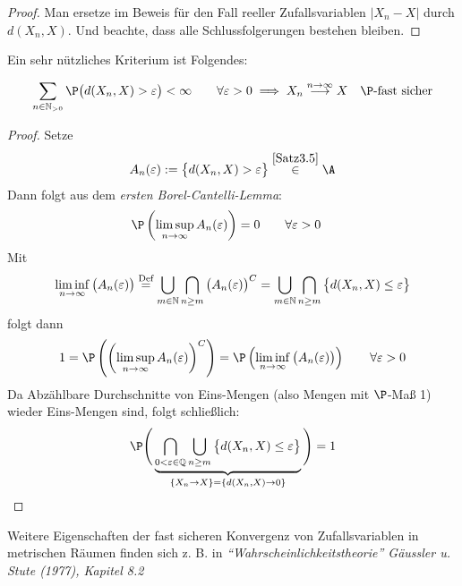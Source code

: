 \begin{proof}
	Man ersetze im Beweis für den Fall reeller Zufallsvariablen $|X_n-X|$ durch $d(X_n,X)$. 
	Und beachte, dass alle Schlussfolgerungen bestehen bleiben.
\end{proof}

Ein sehr nützliches Kriterium ist Folgendes:
\begin{satz}\label{Satz3.10} %
	\begin{align*}
		\sum\limits_{n\in\N_{>0}}\P\big(d(X_n,X)>\varepsilon\big)<\infty\qquad\forall\varepsilon>0
		\implies
		X_n
		\stackrel{n\to\infty}{\longrightarrow}
		X\quad\P\text{-fast sicher}
	\end{align*}
\end{satz}

\begin{proof}
	Setze
	\begin{align*}
		A_n(\varepsilon):=\big\lbrace d(X_n,X)>\varepsilon\big\rbrace\stackrel{\ref{Satz3.5}}{\in}\A
	\end{align*}
	Dann folgt aus dem \textit{ersten Borel-Cantelli-Lemma}:
	\begin{align*}
		&\P\left(\limsup\limits_{n\to\infty} A_n(\varepsilon)\right)=0\qquad\forall\varepsilon>0
	\end{align*}
		Mit
	\begin{align*}
		\liminf\limits_{n\to\infty}\big(A_n(\varepsilon)\big)
		\stackrel{\text{Def}}{=}
		\bigcup\limits_{m\in\mathbb{N}}\bigcap\limits_{n\geq m}\big(A_n(\varepsilon)\big)^C
		=
		\bigcup\limits_{m\in\mathbb{N}}\bigcap\limits_{n\geq m}\big\lbrace d(X_n,X)\leq\varepsilon\big\rbrace
	\end{align*}
	folgt dann
	\begin{align*}
		1=\P\left(\left(\limsup\limits_{n\to\infty} A_n(\varepsilon)\right)^C\right)
		=\P\left(\liminf\limits_{n\to\infty}\big(A_n(\varepsilon)\big)\right)\qquad\forall\varepsilon>0
	\end{align*}
	Da Abzählbare Durchschnitte von Eins-Mengen (also Mengen mit $\P$-Maß 1) wieder Eins-Mengen sind, folgt schließlich:
	\begin{align*}
		\P\Bigg(\underbrace{\bigcap\limits_{0<\varepsilon\in\Q}\bigcup\limits_{n\geq m}\big\lbrace d(X_n,X)\leq\varepsilon\big\rbrace}_{\lbrace X_n\to X\rbrace=\lbrace d(X_n,X)\to0\rbrace}\Bigg)=1
	\end{align*}
\end{proof}

Weitere Eigenschaften der fast sicheren Konvergenz von Zufallsvariablen in metrischen Räumen finden sich z. B. in \textit{``Wahrscheinlichkeitstheorie'' Gäussler u. Stute (1977), Kapitel 8.2}

